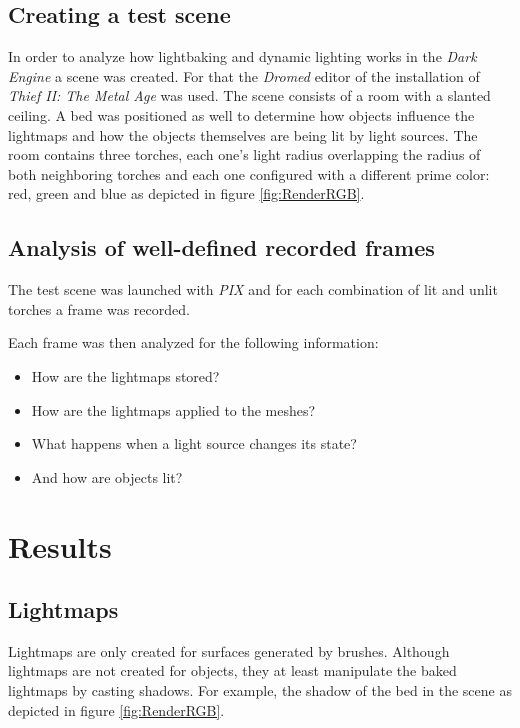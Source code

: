 \subsection{Creating a test scene}

In order to analyze how lightbaking and dynamic lighting works in the \textit{Dark Engine} a scene was created. For that the \textit{Dromed} editor of the installation of \textit{Thief II: The Metal Age} was used. The scene consists of a room with a slanted ceiling. A bed was positioned as well to determine how objects influence the lightmaps and how the objects themselves are being lit by light sources. The room contains three torches, each one's light radius overlapping the radius of both neighboring torches and each one configured with a different prime color: red, green and blue as depicted in figure \ref{fig:RenderRGB}.

\subsection{Analysis of well-defined recorded frames}

The test scene was launched with \textit{PIX} and for each combination of lit and unlit torches a frame was recorded.

Each frame was then analyzed for the following information:

\begin{itemize}
  \item How are the lightmaps stored?
  \item How are the lightmaps applied to the meshes?
	\item What happens when a light source changes its state?
	\item And how are objects lit?
\end{itemize}

\section{Results}

\subsection{Lightmaps}

Lightmaps are only created for surfaces generated by brushes. Although lightmaps are not created for objects, they at least manipulate the baked lightmaps by casting shadows. For example, the shadow of the bed in the scene as depicted in figure \ref{fig:RenderRGB}.

